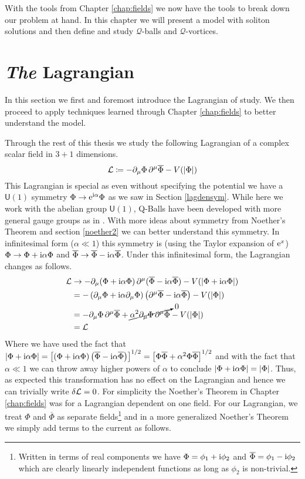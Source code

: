 With the tools from Chapter \ref{chap:fields} we now have the tools to break down our problem at hand. In this chapter we will present a model with soliton solutions and then define and study $\mathcal{Q}$-balls and $\mathcal{Q}$-vortices.

\section{\textit{The} Lagrangian}
In this section we first and foremost introduce the Lagrangian of study. We then proceed to apply techniques learned through Chapter \ref{chap:fields} to better understand the model.

Through the rest of this thesis we study the following Lagrangian of a complex scalar field in $3+1$ dimensions.
\begin{equation}\label{eq:complexlag}
\mathcal{L}\coloneqq -\partial_\mu\Phi\,\partial^\mu\overline{\Phi} - V(|\Phi|)
\end{equation}
This Lagrangian is special as even without specifying the potential we have a $\mathsf{U}(1)$ symmetry $\Phi \to \mathrm{e}^{\mathrm{i}\alpha}\Phi$ as we saw in Section \ref{lagdensym}. While here we work with the abelian group $\mathsf{U}(1)$, Q-Balls have been developed with more general gauge groups as in \cite{nonabelian}. With more ideas about symmetry from Noether's Theorem and section \ref{noether2} we can better understand this symmetry. In infinitesimal form ($\alpha\ll 1$) this symmetry is (using the Taylor expansion of $\mathrm{e}^x$) $\Phi \to \Phi + \mathrm{i}\alpha\Phi$ and $\overline{\Phi} \to \overline{\Phi} - \mathrm{i}\alpha\overline{\Phi}$. Under this infinitesimal form, the Lagrangian changes as follows.
\begin{align}
\mathcal{L} & \to -\partial_\mu(\Phi + \mathrm{i}\alpha\Phi)\,\partial^\mu(\overline{\Phi} - \mathrm{i}\alpha\overline{\Phi}) - V(|\Phi + \mathrm{i}\alpha\Phi|) \\
 & = -\left(\partial_\mu\Phi + \mathrm{i}\alpha\partial_\mu\Phi\right)\left(\partial^\mu\overline{\Phi} - \mathrm{i}\alpha\overline{\Phi}\right) - V(|\Phi|) \\
 & = -\partial_\mu\Phi\,\partial^\mu\overline{\Phi} + \cancelto{0}{\alpha^2\partial_\mu\Phi\,\partial^\mu\overline{\Phi}} - V(|\Phi|) \\
 & = \mathcal{L}
\end{align}
Where we have used the fact that $|\Phi + \mathrm{i}\alpha\Phi| = \left[\left(\Phi + \mathrm{i}\alpha\Phi\right)\left(\overline{\Phi} - \mathrm{i}\alpha\overline{\Phi}\right)\right]^{1/2} = \left[\Phi\overline{\Phi} + \alpha^2\Phi\overline{\Phi}\right]^{1/2}$ and with the fact that $\alpha \ll 1$ we can throw away higher powers of $\alpha$ to conclude $|\Phi + \mathrm{i}\alpha\Phi| = |\Phi|$. Thus, as expected this transformation has no effect on the Lagrangian and hence we can trivially write $\delta\mathcal{L} = 0$. For simplicity the Noether's Theorem in Chapter \ref{chap:fields} was for a Lagrangian dependent on one field. For our Lagrangian, we treat $\Phi$ and $\overline{\Phi}$ as separate fields\footnote{Written in terms of real components we have $\Phi = \phi_1 + \mathrm{i}\phi_2$ and $\overline{\Phi} = \phi_1 - \mathrm{i}\phi_2$ which are clearly linearly independent functions as long as $\phi_2$ is non-trivial.} and in a more generalized Noether's Theorem we simply add terms to the current as follows.
